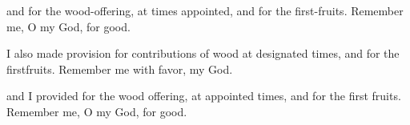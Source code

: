 			\begin{versebox}
					\item[BHS] 
					\item[LXX] 
					\item[ASV] and for the wood-offering, at times appointed, and for the first-fruits. Remember me, O my God, for good.
					\item[NIV] I also made provision for contributions of wood at designated times, and for the firstfruits. Remember me with favor, my God.
					\item[NRSV] and I provided for the wood offering, at appointed times, and for the first fruits. Remember me, O my God, for good.
			\end{versebox}
